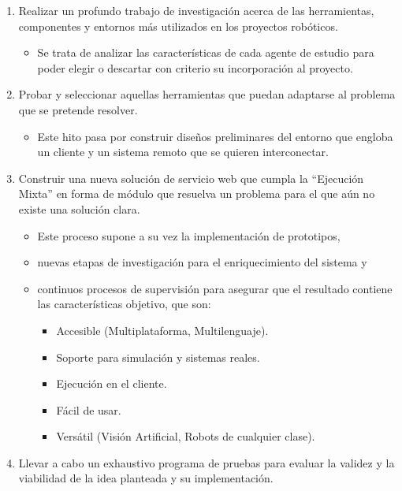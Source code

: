 \begin{enumerate}
\item Realizar un profundo trabajo de investigación acerca de las herramientas, componentes y entornos más utilizados en los proyectos robóticos.
    \begin{itemize}
        \item Se trata de analizar las características de cada agente de estudio para poder elegir o descartar con criterio su incorporación al proyecto.
    \end{itemize}
\item Probar y seleccionar aquellas herramientas que puedan adaptarse al problema que se pretende resolver.
    \begin{itemize}
        \item Este hito pasa por construir diseños preliminares del entorno que engloba un cliente y un sistema remoto que se quieren interconectar.
    \end{itemize}
\item Construir una nueva solución de servicio web que cumpla la ``Ejecución Mixta'' en forma de módulo que resuelva un problema para el que aún no existe una solución clara.
    \begin{itemize}
        \item Este proceso supone a su vez la implementación de prototipos,
        \item nuevas etapas de investigación para el enriquecimiento del sistema y
        \item continuos procesos de supervisión para asegurar que el resultado contiene las características objetivo, que son:
            \begin{itemize}
                \item Accesible (Multiplataforma, Multilenguaje).
                \item Soporte para simulación y sistemas reales.
                \item Ejecución en el cliente.
                \item Fácil de usar.
                \item Versátil (Visión Artificial, Robots de cualquier clase).
            \end{itemize}
    \end{itemize}
\item  Llevar a cabo un exhaustivo programa de pruebas para evaluar la validez y la viabilidad de la idea planteada y su implementación.
\end{enumerate}

